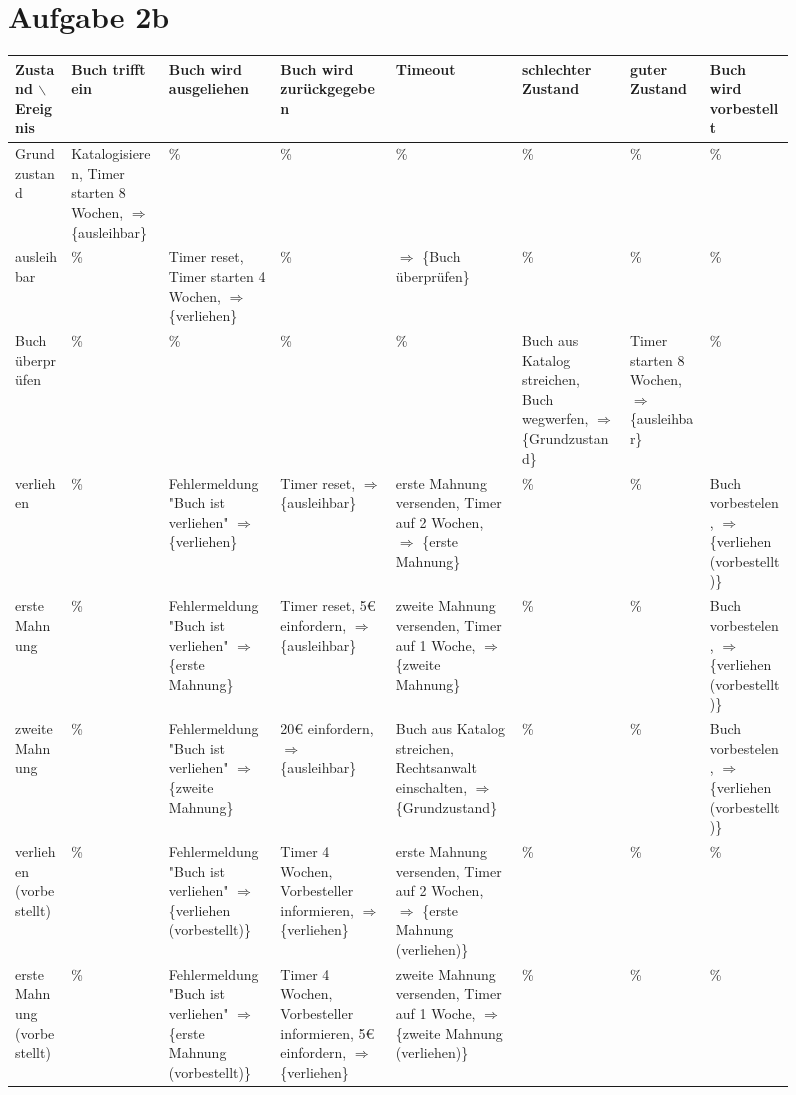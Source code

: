 \documentclass[koma,a4paper,10pt]{org-article}
\begin{document}
\begin{sidewaysfigure}
\section{Aufgabe 2b}
\label{sec-3}
\begin{adjustbox}{width=\textwidth}
\begin{tabular}{|p{3cm}|p{3cm}|p{3cm}|p{3cm}|p{3cm}|p{3cm}|p{3cm}|p{3cm}|}
Zustand $\backslash$ Ereignis & Buch trifft ein & Buch wird ausgeliehen & Buch wird zurückgegeben & Timeout & schlechter Zustand & guter Zustand & Buch wird vorbestellt\\
\hline
Grundzustand & Katalogisieren, Timer starten 8 Wochen, $\Rightarrow$ \{ausleihbar\} & \% & \% & \% & \% & \% & \%\\
ausleihbar & \% & Timer reset, Timer starten 4 Wochen, $\Rightarrow$ \{verliehen\} & \% & $\Rightarrow$ \{Buch überprüfen\} & \% & \% & \%\\
Buch überprüfen & \% & \% & \% & \% & Buch aus Katalog streichen, Buch wegwerfen, $\Rightarrow$ \{Grundzustand\} & Timer starten 8 Wochen, $\Rightarrow$ \{ausleihbar\} & \%\\
verliehen & \% & Fehlermeldung "Buch ist verliehen" $\Rightarrow$ \{verliehen\} & Timer reset, $\Rightarrow$ \{ausleihbar\} & erste Mahnung versenden, Timer auf 2 Wochen, $\Rightarrow$ \{erste Mahnung\} & \% & \% & Buch vorbestelen, $\Rightarrow$ \{verliehen (vorbestellt)\}\\
erste Mahnung & \% & Fehlermeldung "Buch ist verliehen" $\Rightarrow$ \{erste Mahnung\} & Timer reset, 5€ einfordern, $\Rightarrow$ \{ausleihbar\} & zweite Mahnung versenden, Timer auf 1 Woche, $\Rightarrow$ \{zweite Mahnung\} & \% & \% & Buch vorbestelen, $\Rightarrow$ \{verliehen (vorbestellt)\}\\
zweite Mahnung & \% & Fehlermeldung "Buch ist verliehen" $\Rightarrow$ \{zweite Mahnung\} & 20€ einfordern, $\Rightarrow$ \{ausleihbar\} & Buch aus Katalog streichen, Rechtsanwalt einschalten, $\Rightarrow$ \{Grundzustand\} & \% & \% & Buch vorbestelen, $\Rightarrow$ \{verliehen (vorbestellt)\}\\
verliehen (vorbestellt) & \% & Fehlermeldung "Buch ist verliehen" $\Rightarrow$ \{verliehen (vorbestellt)\} & Timer 4 Wochen, Vorbesteller informieren, $\Rightarrow$ \{verliehen\} & erste Mahnung versenden, Timer auf 2 Wochen, $\Rightarrow$ \{erste Mahnung (verliehen)\} & \% & \% & \%\\
erste Mahnung (vorbestellt) & \% & Fehlermeldung "Buch ist verliehen" $\Rightarrow$ \{erste Mahnung (vorbestellt)\} & Timer 4 Wochen, Vorbesteller informieren, 5€ einfordern, $\Rightarrow$ \{verliehen\} & zweite Mahnung versenden, Timer auf 1 Woche, $\Rightarrow$ \{zweite Mahnung (verliehen)\} & \% & \% & \%\\

\end{tabular}
\end{adjustbox}
\end{sidewaysfigure}
\end{document}
